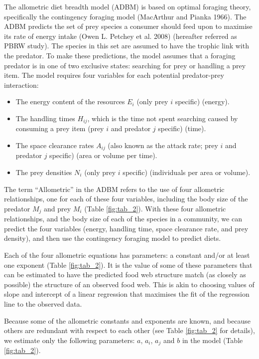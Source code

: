\documentclass{article}
\begin{document}
The allometric diet breadth model (ADBM) is based on optimal foraging
theory, specifically the contingency foraging model (MacArthur and
Pianka 1966). The ADBM predicts the set of prey species a consumer
should feed upon to maximise its rate of energy intake (Owen L. Petchey
et al. 2008) (hereafter referred as PBRW study). The species in this set
are assumed to have the trophic link with the predator. To make these
predictions, the model assumes that a foraging predator is in one of two
exclusive states: searching for prey or handling a prey item. The model
requires four variables for each potential predator-prey interaction:

\begin{itemize}
\tightlist
\item
  The energy content of the resources \(E_i\) (only prey \(i\) specific)
  (energy).
\item
  The handling times \(H_{ij}\), which is the time not spent searching
  caused by consuming a prey item (prey \(i\) and predator \(j\)
  specific) (time).
\item
  The space clearance rates \(A_{ij}\) (also known as the attack rate;
  prey \(i\) and predator \(j\) specific) (area or volume per time).
\item
  The prey densities \(N_i\) (only prey \(i\) specific) (individuals per
  area or volume).
\end{itemize}

The term ``Allometric'' in the ADBM refers to the use of four allometric
relationships, one for each of these four variables, including the body
size of the predator \(M_j\) and prey \(M_i\) (Table \ref{fig:tab_2}).
With these four allometric relationships, and the body size of each of
the species in a community, we can predict the four variables (energy,
handling time, space clearance rate, and prey density), and then use the
contingency foraging model to predict diets.

Each of the four allometric equations has parameters: a constant and/or
at least one exponent (Table \ref{fig:tab_2}). It is the value of some
of these parameters that can be estimated to have the predicted food web
structure match (as closely as possible) the structure of an observed
food web. This is akin to choosing values of slope and intercept of a
linear regression that maximises the fit of the regression line to the
observed data.

Because some of the allometric constants and exponents are known, and
because others are redundant with respect to each other (see Table
\ref{fig:tab_2} for details), we estimate only the following parameters:
\(a\), \(a_i\), \(a_j\) and \(b\) in the model (Table \ref{fig:tab_2}).
\end{document}
